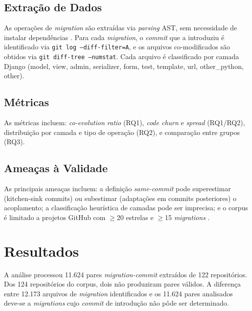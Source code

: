 \documentclass[
  12pt,
  openright,
  oneside,
  a4paper,
  brazil
]{abntex2}
\begin{document}
\section{Extração de Dados}

As operações de \textit{migration} são extraídas via \textit{parsing} AST, sem necessidade de instalar dependências \cite{qiu2013}. Para cada \textit{migration}, o \textit{commit} que a introduziu é identificado via \texttt{git log --diff-filter=A}, e os arquivos co-modificados são obtidos via \texttt{git diff-tree --numstat}. Cada arquivo é classificado por camada Django (model, view, admin, serializer, form, test, template, url, other\_python, other).

\section{Métricas}

As métricas incluem: \textit{co-evolution ratio} (RQ1), \textit{code churn} e \textit{spread} (RQ1/RQ2), distribuição por camada e tipo de operação (RQ2), e comparação entre grupos (RQ3).

\section{Ameaças à Validade}\label{sec:ameacas}

As principais ameaças incluem: a definição \textit{same-commit} pode superestimar (kitchen-sink commits) ou subestimar (adaptações em commits posteriores) o acoplamento; a classificação heurística de camadas pode ser imprecisa; e o corpus é limitado a projetos GitHub com $\geq$20 estrelas e $\geq$15 \textit{migrations} \cite{kalliamvakou2014}.


\chapter{Resultados}\label{chap:resultados}

A análise processou 11.624 pares \textit{migration-commit} extraídos de 122 repositórios. Dos 124 repositórios do corpus, dois não produziram pares válidos. A diferença entre 12.173 arquivos de \textit{migration} identificados e os 11.624 pares analisados deve-se a \textit{migrations} cujo \textit{commit} de introdução não pôde ser determinado.
\end{document}
